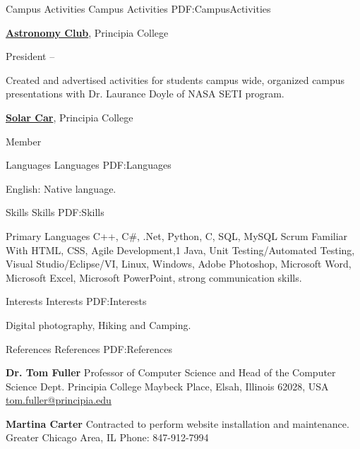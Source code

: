 \documentclass[a4paper,MMMyyyy,nonstopmode]{simpleresumecv}
\begin{document}
\begin{Body}



\Section
{Campus Activities}
{Campus Activities}
{PDF:CampusActivities}

\Entry
\href{http://www.example.com/my-club}
{\textbf{Astronomy Club}},
Principia College

\Gap
\BulletItem
President
\hfill
{} --
\begin{Detail}
\SubBulletItem
Created and advertised activities for students campus wide, organized campus presentations with Dr. Laurance Doyle of NASA SETI program.

\Entry
\Gap
\href{https://www.principiasolarcar.com/}
{\textbf{Solar Car}},
Principia College

\BulletItem
Member
\end{Detail}


\Section
{Languages}
{Languages}
{PDF:Languages}

\BulletItem
English: Native language.


\Section
{Skills}
{Skills}
{PDF:Skills}

\Entry
\BulletItem Primary Languages
\SubBulletItem
C++,
C\#,
.Net,
Python,
C,
SQL, MySQL
Scrum
\Gap
\BulletItem Familiar With
\SubBulletItem
HTML, CSS,
Agile Development,1
Java,
Unit Testing/Automated Testing,
Visual Studio/Eclipse/VI,
Linux, Windows,
Adobe Photoshop,
Microsoft Word,
Microsoft Excel,
Microsoft PowerPoint,
strong communication skills.


\Section
{Interests}
{Interests}
{PDF:Interests}

\Entry
Digital photography,
Hiking and Camping.


\Section
{References}
{References}
{PDF:References}

\BulletItem
\textbf{Dr. Tom Fuller}
\newline
Professor of Computer Science and Head of the Computer Science Dept.
\newline
Principia College
 Maybeck Place, Elsah, Illinois 62028, USA
\newline
\href{mailto:tom.fuller@principia.edu}
{tom.fuller@principia.edu}


\BulletItem
\textbf{Martina Carter}
\newline
Contracted to perform website installation and maintenance. 
\newline
Greater Chicago Area, IL
\newline
{Phone: 847-912-7994}

\end{Body}
\end{document}
